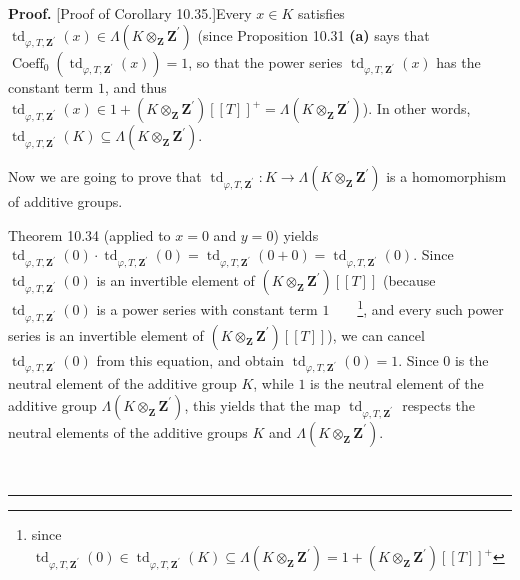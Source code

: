\documentclass[numbers=enddot,12pt,final,onecolumn,notitlepage]{scrartcl}%
\newenvironment{proof}[1][Proof]{\noindent\textbf{#1.} }{\ \rule{0.5em}{0.5em}}
\begin{document}
\begin{proof}
[Proof of Corollary 10.35.]Every $x\in K$ satisfies $\operatorname*{td}%
_{\varphi,T,\mathbf{Z}^{\prime}}\left(  x\right)  \in\Lambda\left(
K\otimes_{\mathbf{Z}}\mathbf{Z}^{\prime}\right)  $ (since Proposition 10.31
\textbf{(a)} says that $\operatorname*{Coeff}\nolimits_{0}\left(
\operatorname*{td}\nolimits_{\varphi,T,\mathbf{Z}^{\prime}}\left(  x\right)
\right)  =1$, so that the power series $\operatorname*{td}\nolimits_{\varphi
,T,\mathbf{Z}^{\prime}}\left(  x\right)  $ has the constant term $1$, and thus
$\operatorname*{td}\nolimits_{\varphi,T,\mathbf{Z}^{\prime}}\left(  x\right)
\in1+\left(  K\otimes_{\mathbf{Z}}\mathbf{Z}^{\prime}\right)  \left[  \left[
T\right]  \right]  ^{+}=\Lambda\left(  K\otimes_{\mathbf{Z}}\mathbf{Z}%
^{\prime}\right)  $). In other words, $\operatorname*{td}_{\varphi
,T,\mathbf{Z}^{\prime}}\left(  K\right)  \subseteq\Lambda\left(
K\otimes_{\mathbf{Z}}\mathbf{Z}^{\prime}\right)  $.

Now we are going to prove that $\operatorname*{td}_{\varphi,T,\mathbf{Z}%
^{\prime}}:K\rightarrow\Lambda\left(  K\otimes_{\mathbf{Z}}\mathbf{Z}^{\prime
}\right)  $ is a homomorphism of additive groups.

Theorem 10.34 (applied to $x=0$ and $y=0$) yields $\operatorname*{td}%
\nolimits_{\varphi,T,\mathbf{Z}^{\prime}}\left(  0\right)  \cdot
\operatorname*{td}\nolimits_{\varphi,T,\mathbf{Z}^{\prime}}\left(  0\right)
=\operatorname*{td}\nolimits_{\varphi,T,\mathbf{Z}^{\prime}}\left(
0+0\right)  =\operatorname*{td}\nolimits_{\varphi,T,\mathbf{Z}^{\prime}%
}\left(  0\right)  $. Since $\operatorname*{td}\nolimits_{\varphi
,T,\mathbf{Z}^{\prime}}\left(  0\right)  $ is an invertible element of
$\left(  K\otimes_{\mathbf{Z}}\mathbf{Z}^{\prime}\right)  \left[  \left[
T\right]  \right]  $ (because $\operatorname*{td}\nolimits_{\varphi
,T,\mathbf{Z}^{\prime}}\left(  0\right)  $ is a power series with constant
term $1$\ \ \ \ \footnote{since $\operatorname*{td}\nolimits_{\varphi
,T,\mathbf{Z}^{\prime}}\left(  0\right)  \in\operatorname*{td}%
\nolimits_{\varphi,T,\mathbf{Z}^{\prime}}\left(  K\right)  \subseteq
\Lambda\left(  K\otimes_{\mathbf{Z}}\mathbf{Z}^{\prime}\right)  =1+\left(
K\otimes_{\mathbf{Z}}\mathbf{Z}^{\prime}\right)  \left[  \left[  T\right]
\right]  ^{+}$}, and every such power series is an invertible element of
$\left(  K\otimes_{\mathbf{Z}}\mathbf{Z}^{\prime}\right)  \left[  \left[
T\right]  \right]  $), we can cancel $\operatorname*{td}\nolimits_{\varphi
,T,\mathbf{Z}^{\prime}}\left(  0\right)  $ from this equation, and obtain
$\operatorname*{td}\nolimits_{\varphi,T,\mathbf{Z}^{\prime}}\left(  0\right)
=1$. Since $0$ is the neutral element of the additive group $K$, while $1$ is
the neutral element of the additive group $\Lambda\left(  K\otimes
_{\mathbf{Z}}\mathbf{Z}^{\prime}\right)  $, this yields that the map
$\operatorname*{td}\nolimits_{\varphi,T,\mathbf{Z}^{\prime}}$ respects the
neutral elements of the additive groups $K$ and $\Lambda\left(  K\otimes
_{\mathbf{Z}}\mathbf{Z}^{\prime}\right)  $.


\end{proof}
\end{document}
